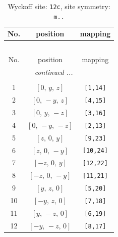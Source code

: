\documentclass[fleqn,8pt]{jsarticle}
\begin{document}
\begin{longtable}{ccc}
\caption{Wyckoff site: {\tt 12c}, site symmetry: {\tt m..}}
 \\
 \hline \hline
No. & position & mapping \\ \hline \endfirsthead

\multicolumn{2}{l}{\tablename\ \thetable{}} \\
 \hline \hline
No. & position & mapping \\ \hline \endhead

 \hline \hline
\multicolumn{2}{r}{\footnotesize\it continued ...} \\ \endfoot

 \hline \hline
\multicolumn{2}{r}{} \\ \endlastfoot

1 & $\left[ 0,\, y,\, z \right]$ & {\tt [1,14]} \\ \hline
2 & $\left[ 0,\, - y,\, z \right]$ & {\tt [4,15]} \\ \hline
3 & $\left[ 0,\, y,\, - z \right]$ & {\tt [3,16]} \\ \hline
4 & $\left[ 0,\, - y,\, - z \right]$ & {\tt [2,13]} \\ \hline
5 & $\left[ z,\, 0,\, y \right]$ & {\tt [9,23]} \\ \hline
6 & $\left[ z,\, 0,\, - y \right]$ & {\tt [10,24]} \\ \hline
7 & $\left[ - z,\, 0,\, y \right]$ & {\tt [12,22]} \\ \hline
8 & $\left[ - z,\, 0,\, - y \right]$ & {\tt [11,21]} \\ \hline
9 & $\left[ y,\, z,\, 0 \right]$ & {\tt [5,20]} \\ \hline
10 & $\left[ - y,\, z,\, 0 \right]$ & {\tt [7,18]} \\ \hline
11 & $\left[ y,\, - z,\, 0 \right]$ & {\tt [6,19]} \\ \hline
12 & $\left[ - y,\, - z,\, 0 \right]$ & {\tt [8,17]} \\
\end{longtable}
\renewcommand{\arraystretch}{1.2}
\end{document}
